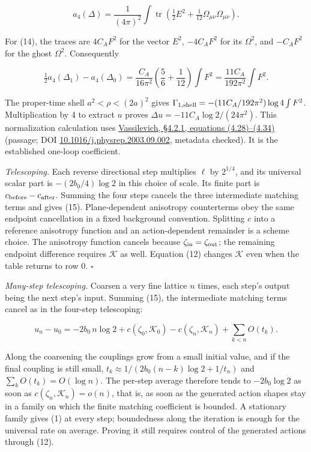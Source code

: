 \documentclass[11pt,a4paper]{article}
\begin{document}
\[a_4(\Delta)=\frac1{(4\pi)^2}\int
 \operatorname{tr}\left(\tfrac12E^2+\tfrac1{12}\Omega_{\mu\nu}\Omega_{\mu\nu}\right).\]

For (14), the traces are \(4C_AF^2\) for the vector \(E^2\),
\(-4C_AF^2\) for its \(\Omega^2\), and \(-C_AF^2\) for the ghost
\(\Omega^2\). Consequently

\[\tfrac12a_4(\Delta_1)-a_4(\Delta_0)
 =\frac{C_A}{16\pi^2}\left(\frac56+\frac1{12}\right)\int F^2
 =\frac{11C_A}{192\pi^2}\int F^2.\]

The proper-time shell \(a^2<\rho<(2a)^2\) gives
\(\Gamma_{1,\rm shell}=-(11C_A/192\pi^2)\log4\int F^2\). Multiplication
by 4 to extract \(u\) proves \(\Delta u=-11C_A\log2/(24\pi^2)\). This
normalization calculation uses
\href{https://arxiv.org/pdf/hep-th/0306138}{Vassilevich, §4.2.1,
equations (4.28)--(4.34)} (passage; DOI
\href{https://doi.org/10.1016/j.physrep.2003.09.002}{10.1016/j.physrep.2003.09.002},
metadata checked). It is the established one-loop coefficient.

\emph{Telescoping.} Each reverse directional step multiplies \(\ell\) by
\(2^{1/4}\), and its universal scalar part is \(-(2b_0/4)\log2\) in this
choice of scale. Its finite part is \(c_{\rm before}-c_{\rm after}\).
Summing the four steps cancels the three intermediate matching terms and
gives (15). Plane-dependent anisotropy counterterms obey the same
endpoint cancellation in a fixed background convention. Splitting \(c\)
into a reference anisotropy function and an action-dependent remainder
is a scheme choice. The anisotropy function cancels because
\(\zeta_{\rm in}=\zeta_{\rm out}\); the remaining endpoint difference
requires \(\mathcal K\) as well. Equation (12) changes \(\mathcal K\)
even when the table returns to row 0. \(\square\)

\emph{Many-step telescoping.} Coarsen a very fine lattice \(n\) times,
each step's output being the next step's input. Summing (15), the
intermediate matching terms cancel as in the four-step telescoping:

\[u_n-u_0=-2b_0\,n\log2+c(\zeta_0,\mathcal K_0)-c(\zeta_n,\mathcal K_n)+\sum_{k<n}O(t_k).\]

Along the coarsening the couplings grow from a small initial value, and
if the final coupling is still small,
\(t_k\approx1/(2b_0(n-k)\log2+1/t_n)\) and \(\sum_kO(t_k)=O(\log n)\).
The per-step average therefore tends to \(-2b_0\log2\) as soon as
\(c(\zeta_n,\mathcal K_n)=o(n)\), that is, as soon as the generated
action shapes stay in a family on which the finite matching coefficient
is bounded. A stationary family gives (1) at every step; boundedness
along the iteration is enough for the universal rate on average. Proving
it still requires control of the generated actions through (12).
\end{document}
